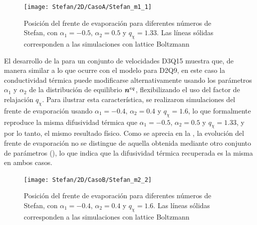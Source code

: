 \begin{figure}[ht]
	\centering
	\texttt{[image: Stefan/2D/CasoA/Stefan\_m1\_1]}
	\caption{Posici\'on del frente de evaporaci\'on para diferentes n\'umeros de Stefan, con $\alpha_1 = -0.5$, $\alpha_2=0.5$ y $q_{\chi} = 1.33$. Las l\'ineas s\'olidas corresponden a las simulaciones con lattice Boltzmann}
	\label{fig:Stefan_m1_1_3D}
\end{figure}

El desarrollo de la \lbe{} para un conjunto de velocidades D3Q15 muestra que, de manera similar a lo que ocurre con el modelo para D2Q9, en este caso la conductividad t\'ermica puede modificarse alternativamente usando los par\'ametros $\alpha_1$ y $\alpha_2$ de la distribuci\'on de equilibrio $\bm{n}^{eq}$, flexibilizando el uso del factor de relajaci\'on $q_{\chi}$. Para ilustrar esta caracter\'istica, se realizaron simulaciones del frente de evaporaci\'on usando $\alpha_1=-0.4$, $\alpha_2=0.4$ y $q_{\chi}=1.6$, lo que formalmente reproduce la misma difusividad t\'ermica que $\alpha_1=-0.5$, $\alpha_2=0.5$ y $q_{\chi}=1.33$, y por lo tanto, el mismo resultado f\'isico. Como se aprecia en la , la evoluci\'on del frente de evaporaci\'on no se distingue de aquella obtenida mediante otro conjunto de par\'ametros (), lo que indica que la difusividad t\'ermica recuperada es la misma en ambos casos. 

\begin{figure}[ht]
	\centering
	\texttt{[image: Stefan/2D/CasoB/Stefan\_m2\_2]}
	\caption{Posici\'on del frente de evaporaci\'on para diferentes n\'umeros de Stefan, con $\alpha_1 = -0.4$, $\alpha_2=0.4$ y $q_{\chi} = 1.6$. Las l\'ineas s\'olidas corresponden a las simulaciones con lattice Boltzmann}
	\label{fig:Stefan_m2_2_3D}
\end{figure}
